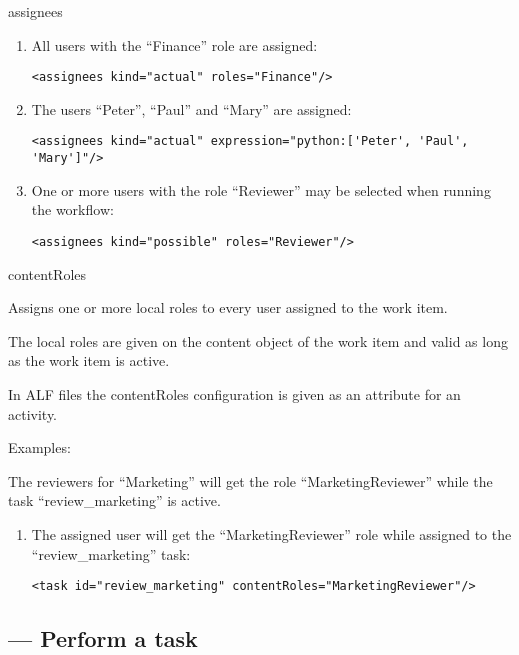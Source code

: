 \begin{memberdesc}{assignees}
        \begin{enumerate}
            \item All users with the ``Finance'' role are assigned:
\begin{verbatim}
<assignees kind="actual" roles="Finance"/>
\end{verbatim}
            \item The users ``Peter'', ``Paul'' and ``Mary'' are assigned:
\begin{verbatim}
<assignees kind="actual" expression="python:['Peter', 'Paul', 'Mary']"/>
\end{verbatim}
            \item One or more users with the role ``Reviewer'' may be selected when running the workflow:
\begin{verbatim}
<assignees kind="possible" roles="Reviewer"/>
\end{verbatim}
        \end{enumerate}
  \end{memberdesc}

  \begin{memberdesc}{contentRoles}

        Assigns one or more local roles to every user assigned to the work item.

        The local roles are given on the content object of the work item and
        valid as long as the work item is active.

        In ALF files the contentRoles configuration is given as an attribute
        for an activity.

        Examples:

        The reviewers for ``Marketing'' will get the role ``MarketingReviewer''
        while the task ``review\_marketing'' is active.

        \begin{enumerate}
            \item The assigned user will get the ``MarketingReviewer'' role while assigned to the ``review\_marketing'' task:
\begin{verbatim}
<task id="review_marketing" contentRoles="MarketingReviewer"/>
\end{verbatim}
        \end{enumerate}

  \end{memberdesc}

  \subsection{ --- Perform a task}

